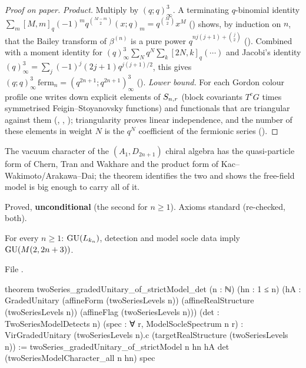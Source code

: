 \begin{proof}[Proof on paper]
\emph{Product.} Multiply by $(q;q)_\infty^3$. A terminating $q$-binomial identity
$\sum_m[M,m]_q(-1)^mq^{\binom{M-m}{2}}(x;q)_m=q^{\binom M2}x^M$ () shows, by induction on $n$, that
the Bailey transform of $\beta^{(n)}$ is a pure power $q^{nj(j+1)+\binom j2}$ (). Combined with a moment
identity for $(q)_\infty^3\sum_Nq^N\sum_k[2N,k]_q(\cdots)$ and Jacobi's identity
$(q)_\infty^3=\sum_j(-1)^j(2j+1)q^{j(j+1)/2}$, this gives $(q;q)_\infty^3\,\mathrm{ferm}_n=(q^{2n+1};q^{2n+1})_\infty^3$
(). \emph{Lower bound.} For each Gordon colour profile one writes down explicit
elements of $S_{n,r}$ (block covariants $T^cG$ times symmetrised Feigin--Stoyanovsky functions) and functionals
that are triangular against them (, , ); triangularity proves linear independence, and
the number of these elements in weight $N$ is the $q^N$ coefficient of the fermionic series
().
\end{proof}

\begin{physics}
The vacuum character of the $(A_1,D_{2n+1})$ chiral algebra has the quasi-particle form of Chern, Tran and Wakhare and
the product form of Kac--Wakimoto/Arakawa--Dai; the theorem identifies the two and shows the free-field model is
big enough to carry all of it.
\end{physics}

\begin{status}
Proved, \textbf{unconditional} (the second for $n\ge1$). Axioms standard (re-checked, both).
\end{status}

\begin{theorem}\label{l29:thm:strictdet}
For every $n\ge1$: $\mathrm{GU}(L_{k_n})$, detection and model socle data imply $\mathrm{GU}(M(2,2n+3))$.
\end{theorem}

\noindent File .
\begin{leancode}
theorem twoSeries_gradedUnitary_of_strictModel_det (n : ℕ) (hn : 1 ≤ n)
    (hA : GradedUnitary (affineForm (twoSeriesLevels n)) (affineRealStructure (twoSeriesLevels n))
      (affineFlag (twoSeriesLevels n)))
    (det : TwoSeriesModelDetects n) (spec : ∀ r, ModelSocleSpectrum n r) :
    VirGradedUnitary (twoSeriesLevels n).c (targetRealStructure (twoSeriesLevels n)) :=
  twoSeries_gradedUnitary_of_strictModel n hn hA det (twoSeriesModelCharacter_all n hn) spec
\end{leancode}

